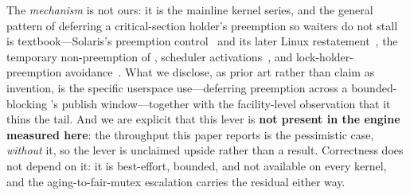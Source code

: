 \documentclass[11pt]{article}
\begin{document}
The \emph{mechanism} is not ours: it is the mainline kernel series, and the
general pattern of deferring a critical-section holder's preemption so waiters do
not stall is textbook---Solaris's  preemption
control~\citep{kosche1999preemption} and its later Linux
restatement~\citep{aziz2014preempt}, the temporary non-preemption of
\citet{marsh1991firstclass}, scheduler activations~\citep{anderson1991scheduler},
and lock-holder-preemption avoidance~\citep{dice2016lockholder}. What
we disclose, as prior art rather than claim as invention, is the specific
userspace use---deferring preemption across a bounded-blocking \mcas's publish
window---together with the facility-level observation that it thins the tail. And
we are explicit that this lever is \textbf{not present in the engine measured
here}: the throughput this paper reports is the pessimistic case, \emph{without}
it, so the lever is unclaimed upside rather than a result. Correctness does not
depend on it: it is best-effort, bounded, and not available on every kernel, and
the aging-to-fair-mutex escalation carries the residual either way.
\end{document}
